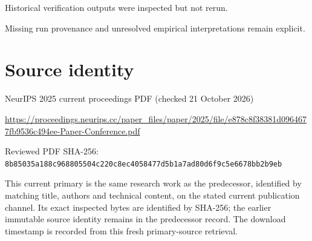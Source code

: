 \documentclass[11pt]{article}
\begin{document}
Historical verification outputs were inspected but not rerun.\par

Missing run provenance and unresolved empirical interpretations remain explicit.\par

\section*{Source identity}

NeurIPS 2025 current proceedings PDF (checked 21 October 2026)

\url{https://proceedings.neurips.cc/paper_files/paper/2025/file/e878c8f38381d0964677fb9536c494ee-Paper-Conference.pdf}

Reviewed PDF SHA-256: \nolinkurl{8b85035a188c968805504c220c8ec4058477d5b1a7ad80d6f9c5e6678bb2b9eb}

This current primary is the same research work as the predecessor, identified by matching title, authors and technical content, on the stated current publication channel. Its exact inspected bytes are identified by SHA-256; the earlier immutable source identity remains in the predecessor record. The download timestamp is recorded from this fresh primary-source retrieval.
\end{document}
